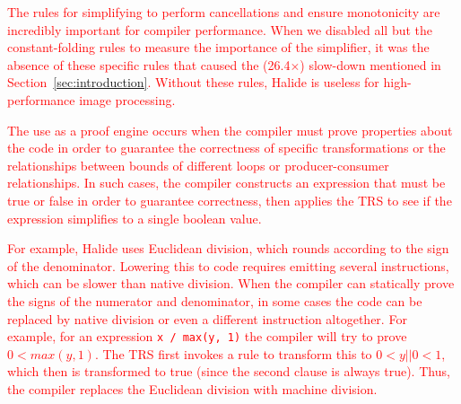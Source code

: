 \documentclass[acmsmall,review]{acmart}\settopmatter{printfolios=true,printccs=false,printacmref=false}
\newcommand{\modified}[1]{\textcolor{red}{{#1}}}
\newcommand{\hmax}[0]{\texttt{max}}
\newcommand{\hmin}[0]{\texttt{min}}
\begin{document}
\modified{The rules for simplifying to perform cancellations and
  ensure monotonicity are incredibly important for compiler
  performance. When we disabled all but the constant-folding rules to
  measure the importance of the simplifier, it was the absence of
  these specific rules that caused the (26.4$\times$) slow-down
  mentioned in Section~\ref{sec:introduction}. Without these rules,
  Halide is useless for high-performance image
  processing.}


\modified{The use as a proof engine occurs when the compiler must prove properties about the code in order to guarantee the
  correctness of specific transformations or the relationships between bounds of
  different loops or producer-consumer relationships.  In such cases, the compiler constructs
  an expression that must be true or false in order to guarantee correctness, then applies
  the TRS to see if the expression simplifies to a single boolean value.}

\modified{For example, Halide uses Euclidean division, which rounds according to the sign of the
  denominator.  Lowering this to code requires emitting several instructions, which can be
  slower than native division.  When the compiler can statically prove the signs of the numerator
  and denominator, in some cases the code can be replaced by native division or even a different
  instruction altogether.  For example, for an expression \texttt{x / max(y, 1)} the compiler
  will try to prove $0 < max(y, 1)$.  The TRS first invokes a rule to transform this to
  $0 < y || 0 < 1$, which then is transformed to true (since the second clause is always true).
  Thus, the compiler replaces the Euclidean division with machine division.}
\end{document}
